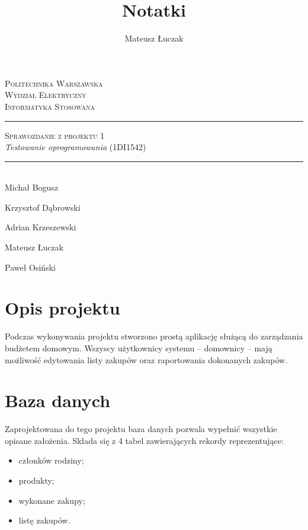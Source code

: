 \documentclass[a4paper,11pt]{article}
\title{Notatki}
\author{Mateusz Łuczak}
\date{}
\begin{document}


\thispagestyle{empty}
\begin{center}
	\textsc{\LARGE Politechnika Warszawska}\\[1.5cm]

	\textsc{\Large Wydział Elektryczny}\\[0.5cm]

	\textsc{\large Informatyka Stosowana}\\[2cm]

	\rule{\linewidth}{0.5mm}

	\textsc{\Large Sprawozdanie z projektu 1}\\[0.5cm]

	\textit{Testowanie oprogramowania} (1DI1542)

	\rule{\linewidth}{0.5mm}\\[3cm]

	\normalsize
	Michał Bogusz
	
	Krzysztof Dąbrowski

	Adrian Krzeszewski

	Mateusz Łuczak

	Paweł Osiński
\end{center}

\newpage
{}
\tableofcontents
\newpage

\section{Opis projektu}
Podczas wykonywania projektu stworzono prostą aplikację służącą do zarządzania budżetem domowym. Wszyscy użytkownicy systemu -- domownicy -- mają możliwość edytowania listy zakupów oraz raportowania dokonanych zakupów.

\section{Baza danych}
Zaprojektowana do tego projektu baza danych pozwala wypełnić wszystkie opisane założenia. Składa się z 4 tabel zawierających rekordy reprezentujące:
\begin{itemize}
	\item członków rodziny;
	\item produkty;
	\item wykonane zakupy;
	\item listę zakupów.
\end{itemize}
\end{document}
